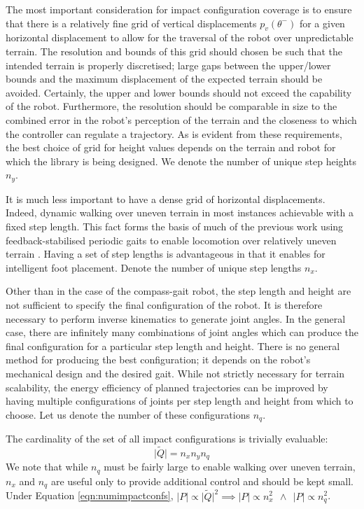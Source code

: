 The most important consideration for impact configuration coverage is to ensure that there is a relatively fine grid of vertical displacements $p_v(\theta^-)$ for a given horizontal displacement to allow for the traversal of the robot over unpredictable terrain. The resolution and bounds of this grid should chosen be such that the intended terrain is properly discretised; large gaps between the upper/lower bounds and the maximum displacement of the expected terrain should be avoided. Certainly, the upper and lower bounds should not exceed the capability of the robot. Furthermore, the resolution should be comparable in size to the combined error in the robot's perception of the terrain and the closeness to which the controller can regulate a trajectory. As is evident from these requirements, the best choice of grid for height values depends on the terrain and robot for which the library is being designed. We denote the number of unique step heights $n_y$.

It is much less important to have a dense grid of horizontal displacements. Indeed, dynamic walking over uneven terrain in most instances achievable with a fixed step length. This fact forms the basis of much of the previous work using feedback-stabilised periodic gaits to enable locomotion over relatively uneven terrain \cite{bigdog?}. Having a set of step lengths is advantageous in that it enables for intelligent foot placement. Denote the number of unique step lengths $n_x$.

Other than in the case of the compass-gait robot, the step length and height are not sufficient to specify the final configuration of the robot. It is therefore necessary to perform inverse kinematics to generate joint angles. In the general case, there are infinitely many combinations of joint angles which can produce the final configuration for a particular step length and height. There is no general method for producing the best configuration; it depends on the robot's mechanical design and the desired gait. While not strictly necessary for terrain scalability, the energy efficiency of planned trajectories can be improved by having multiple configurations of joints per step length and height from which to choose. Let us denote the number of these configurations $n_q$.

The cardinality of the set of all impact configurations is trivially evaluable:
\begin{equation} \label{eqn:numimpactconfs}
\lvert\tilde{Q}\rvert = n_xn_yn_q
\end{equation}
We note that while $n_q$ must be fairly large to enable walking over uneven terrain, $n_x$ and $n_q$ are useful only to provide additional control and should be kept small. Under Equation \ref{eqn:numimpactconfs}, $\lvert P \rvert \propto \lvert\tilde{Q}\rvert^2 \implies \lvert P \rvert \propto n_x^2 ~~\wedge~~ \lvert P \rvert \propto n_q^2$.

